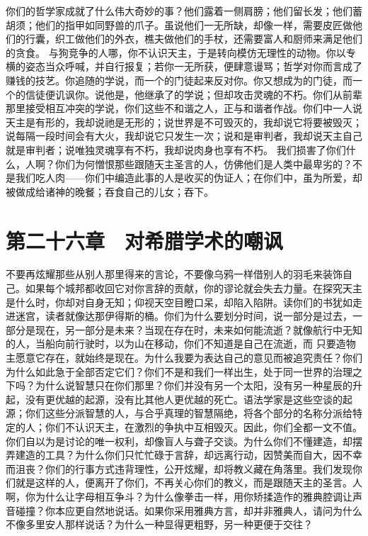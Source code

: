 你们的哲学家成就了什么伟大奇妙的事？他们露着一侧肩膀；他们留长发；他们蓄胡须；他们的指甲如同野兽的爪子。虽说他们一无所缺，却像一样，需要皮匠做他们的行囊，织工做他们的外衣，樵夫做他们的手杖，还需要富人和厨师来满足他们的贪食。\newline{} 与狗竞争的人哪，你不认识天主，于是转向模仿无理性的动物。你以专横的姿态当众呼喊，并自行报复；若你一无所获，便肆意谩骂；哲学对你而言成了赚钱的技艺。你追随的学说，而一个的门徒起来反对你。你又想成为的门徒，而一个的信徒便讥讽你。说他是，他继承了的学说；但却攻击灵魂的不朽。你们从前辈那里接受相互冲突的学说，你们这些不和谐之人，正与和谐者作战。你们中一人说天主是有形的，我却说祂是无形的；说世界是不可毁灭的，我却说它将要被毁灭；说每隔一段时间会有大火，我却说它只发生一次；说和是审判者，我却说天主自己就是审判者；说唯独灵魂享有不朽，我却说肉身也享有不朽。\newline{} 我们损害了你们什么，人啊？你们为何憎恨那些跟随天主圣言的人，仿佛他们是人类中最卑劣的？不是我们吃人肉——你们中编造此事的人是收买的伪证人；在你们中，虽为所爱，却被做成给诸神的晚餐；吞食自己的儿女；吞下。\par


\section{第二十六章　对希腊学术的嘲讽}

不要再炫耀那些从别人那里得来的言论，不要像乌鸦一样借别人的羽毛来装饰自己。如果每个城邦都收回它对你言辞的贡献，你的谬论就会失去力量。在探究天主是什么时，你却对自身无知；仰视天空目瞪口呆，却陷入陷阱。读你们的书犹如走进迷宫，读者就像达那伊得斯的桶。你们为什么要划分时间，说一部分是过去，一部分是现在，另一部分是未来？当现在存在时，未来如何能流逝？就像航行中无知的人，当船向前行驶时，以为山在移动，你们不知道是自己在流逝，而 只要造物主愿意它存在，就始终是现在。为什么我要为表达自己的意见而被追究责任？你们为什么如此急于全部否定它们？你们不是和我们一样出生，处于同一世界的治理之下吗？为什么说智慧只在你们那里？你们并没有另一个太阳，没有另一种星辰的升起，没有更优越的起源，没有比其他人更优越的死亡。语法学家是这些空谈的起源；你们这些分派智慧的人，与合乎真理的智慧隔绝，将各个部分的名称分派给特定的人；你们不认识天主，在激烈的争执中互相毁灭。因此，你们全都一文不值。你们自以为是讨论的唯一权利，却像盲人与聋子交谈。为什么你们不懂建造，却摆弄建造的工具？为什么你们只忙忙碌于言辞，却远离行动，因赞美而自大，因不幸而沮丧？你们的行事方式违背理性，公开炫耀，却将教义藏在角落里。我们发现你们就是这样的人，便离开了你们，不再关心你们的教义，而是跟随天主的圣言。人啊，你为什么让字母相互争斗？为什么像拳击一样，用你矫揉造作的雅典腔调让声音碰撞？你本应更自然地说话。如果你采用雅典方言，却并非雅典人，请问为什么不像多里安人那样说话？为什么一种显得更粗野，另一种更便于交往？\par

